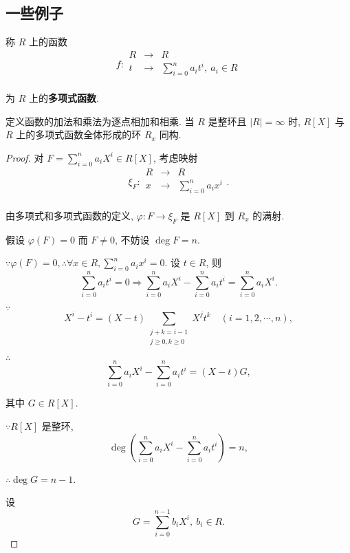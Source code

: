 \documentclass[UTF8]{ctexart}
\begin{document}
\subsection{一些例子}
\begin{example}\label{exp2.5}
    称 $R$ 上的函数
    \[f:\begin{array}{rcl}
        R & \to & R \\
        t & \to & \sum\limits_{i=0}^{n}a_it^i,\ a_i\in R \\
    \end{array}\]

    为 $R$ 上的\textbf{多项式函数}.

    定义函数的加法和乘法为逐点相加和相乘. 当 $R$ 是整环且 $|R|=\infty$ 时, $R[X]$ 与 $R$ 上的多项式函数全体形成的环 $R_x$ 同构.
\end{example}
\begin{proof}
    对 $F=\sum\limits_{i=0}^{n}a_iX^i\in R[X]$, 考虑映射
    \[\xi_F:\begin{array}{rcl}
        R & \to & R \\
        x & \to & \sum\limits_{i=0}^{n}a_ix^i \\
    \end{array}.\]

    由多项式和多项式函数的定义, $\varphi:F\to\xi_F$ 是 $R[X]$ 到 $R_x$ 的满射.

    假设 $\varphi(F)=0$ 而 $F\neq0$, 不妨设 $\deg F=n$.

    $\because\varphi(F)=0,\therefore\forall x\in R,\sum\limits_{i=0}^{n}a_ix^i=0$. 设 $t\in R$, 则
    \[\sum\limits_{i=0}^{n}a_it^i=0\Rightarrow\sum\limits_{i=0}^{n}a_iX^i-\sum\limits_{i=0}^{n}a_it^i=\sum\limits_{i=0}^{n}a_iX^i.\]

    $\because$
    \[X^i-t^i=(X-t)\sum\limits_{\substack{j+k=i-1\\j\geq0,k\geq0}}X^jt^k\quad(i=1,2,\cdots,n),\]

    $\therefore$
    \begin{equation}\label{eq2.3}
        \sum\limits_{i=0}^{n}a_iX^i-\sum\limits_{i=0}^{n}a_it^i=(X-t)G,
    \end{equation}

    其中 $G\in R[X]$.

    $\because R[X]$ 是整环,
    \[\deg\left(\sum\limits_{i=0}^{n}a_iX^i-\sum\limits_{i=0}^{n}a_it^i\right)=n,\]

    $\therefore\deg G=n-1$.

    设
    \[G=\sum\limits_{i=0}^{n-1}b_iX^i,\ b_i\in R.\]


\end{proof}
\end{document}
